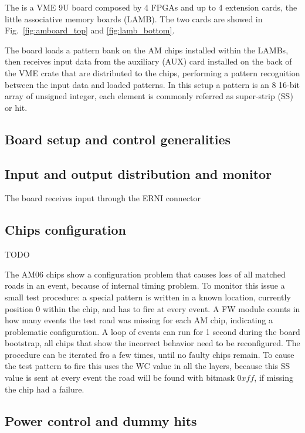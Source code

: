 The \AMBoard is a VME 9U board composed by 4 FPGAs and up to 4 extension cards,
the little associative memory boards (LAMB). The two cards are showed in 
Fig.~\ref{fig:amboard_top} and \ref{fig:lamb_bottom}.

The board loads a pattern
bank on the AM chips installed within the LAMBs, then receives input data
from the auxiliary (AUX) card installed on the back of the VME crate that are
distributed to the chips, performing a pattern recognition between the 
input data and loaded patterns. In this setup a pattern is an 8 16-bit array
of unsigned integer, each element is commonly referred as super-strip (SS)
or hit. 

\subsection{Board setup and control generalities}

\subsection{Input and output distribution and monitor}

The board receives input through the ERNI connector

\subsection{Chips configuration}
\label{sec:chipconfig}
 TODO
 
The AM06 chips show a configuration problem that causes loss of all matched
roads in an event, because of internal timing problem. To monitor this issue a
small test procedure: a special pattern is written in a known location, currently
position 0 within the chip, and has to fire at every event. A FW module counts in
how many events the test road was missing for each AM chip, indicating a problematic
configuration.
A loop of events can run for 1 second during the board 
bootstrap, all chips that show the incorrect behavior need to be reconfigured.
The procedure can be iterated fro a few times, until no faulty chips remain.
To cause the test pattern to fire this uses the WC value in all the layers,
because this SS value is sent at every event the road will be found with bitmask
$0xff$, if missing the chip had a failure.
 
\subsection{Power control and dummy hits}
\label{sec:powercontrol}

